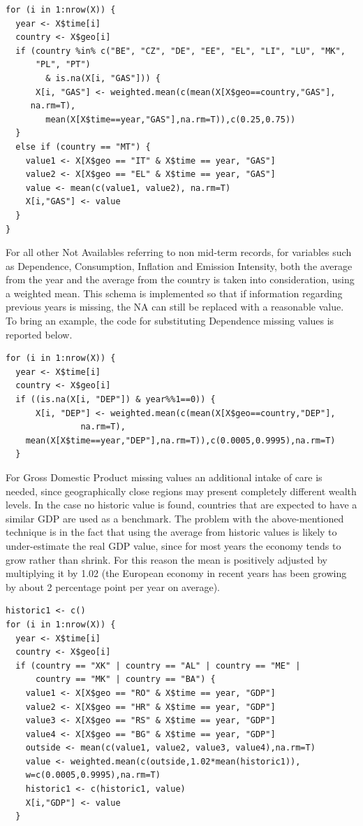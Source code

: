 \documentclass[a4paper,12pt]{book}
\begin{document}
\begin{appendices}
\begin{verbatim}
for (i in 1:nrow(X)) {
  year <- X$time[i]
  country <- X$geo[i]
  if (country %in% c("BE", "CZ", "DE", "EE", "EL", "LI", "LU", "MK",
	  "PL", "PT") 
		& is.na(X[i, "GAS"])) {
      X[i, "GAS"] <- weighted.mean(c(mean(X[X$geo==country,"GAS"],
  	 na.rm=T),
		mean(X[X$time==year,"GAS"],na.rm=T)),c(0.25,0.75))
  }
  else if (country == "MT") {
    value1 <- X[X$geo == "IT" & X$time == year, "GAS"]
    value2 <- X[X$geo == "EL" & X$time == year, "GAS"]
    value <- mean(c(value1, value2), na.rm=T)
    X[i,"GAS"] <- value
  }
}
\end{verbatim}

For all other Not Availables referring to non mid-term records, for variables such as Dependence, Consumption, Inflation and Emission Intensity, both the average from the year and the average from the country is taken into consideration, using a weighted mean. This schema is implemented so that if information regarding previous years is missing, the NA can still be replaced with a reasonable value. To bring an example, the code for substituting Dependence missing values is reported below.

\begin{verbatim}
for (i in 1:nrow(X)) {
  year <- X$time[i]
  country <- X$geo[i]
  if ((is.na(X[i, "DEP"]) & year%%1==0)) {
      X[i, "DEP"] <- weighted.mean(c(mean(X[X$geo==country,"DEP"],
	  		   na.rm=T),
	mean(X[X$time==year,"DEP"],na.rm=T)),c(0.0005,0.9995),na.rm=T)
  }
\end{verbatim}

For Gross Domestic Product missing values an additional intake of care is needed, since geographically close regions may present completely different wealth levels. In the case no historic value is found, countries that are expected to have a similar GDP are used as a benchmark. The problem with the above-mentioned technique is in the fact that using the average from historic values is likely to under-estimate the real GDP value, since for most years the economy tends to grow rather than shrink. For this reason the mean is positively adjusted by multiplying it by 1.02 (the European economy in recent years has been growing by about 2 percentage point per year on average).

\begin{verbatim}
historic1 <- c()
for (i in 1:nrow(X)) {
  year <- X$time[i]
  country <- X$geo[i]
  if (country == "XK" | country == "AL" | country == "ME" |
      country == "MK" | country == "BA") {
    value1 <- X[X$geo == "RO" & X$time == year, "GDP"]
    value2 <- X[X$geo == "HR" & X$time == year, "GDP"]
    value3 <- X[X$geo == "RS" & X$time == year, "GDP"]
    value4 <- X[X$geo == "BG" & X$time == year, "GDP"]
    outside <- mean(c(value1, value2, value3, value4),na.rm=T)
    value <- weighted.mean(c(outside,1.02*mean(historic1)),
    w=c(0.0005,0.9995),na.rm=T)
    historic1 <- c(historic1, value)
    X[i,"GDP"] <- value
  }
\end{verbatim}


\end{appendices}
\end{document}
